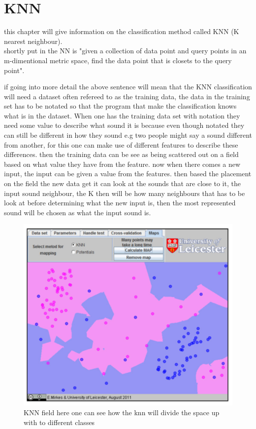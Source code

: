 \section{KNN}
this chapter will give information on the classification method called KNN (K nearest neighbour).\\
shortly put in \citep{meaningfulNN} the NN is "given a collection of data point and query points in an m-dimentional metric space, find the data point that is closets to the query point".

if going into more detail the above sentence will mean that the KNN classification will need a dataset often refereed to as the training data, the data in the training set has to be notated so that the program that make the classification knows what is in the dataset. When one has the training data set with notation they need some value to describe what sound it is  because even though notated they can still be different in how they sound e.g two people might say a sound different from another, for this one can make use of different features to describe these differences. then the training data can be see as being scattered out on a field based on what value they have from the feature. now when there comes a new input, the input can be given a value from the features. then based the placement on the field the new data get it can look at the sounds that are close to it, the input sound neighbour, the K then will be how many neighbours that has to be look at before determining what the new input is, then the most represented sound will be chosen as what the input sound is. 
\begin{figure}[h]
	\begin{center}
		\includegraphics[scale = 0.5]{fig/KNNfig.jpg}
		\caption{KNN field here one can see how the knn will divide the space up with to different classes}
		\label{KNN fig}
	\end{center}
\end{figure}
